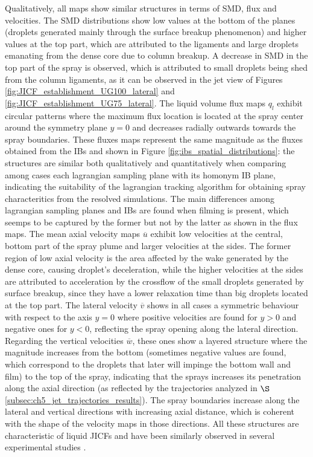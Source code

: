 Qualitatively, all maps show similar structures in terms of SMD, flux and velocities. The SMD distributions show low values at the bottom of the planes (droplets generated mainly through the surface breakup phenomenon) and higher values at the top part, which are attributed to the ligaments and large droplets emanating from the dense core due to column breakup. A decrease in SMD in the top part of the spray is observed, which is attributed to small droplets being shed from the column ligaments, as it can be observed in the jet view of Figures \ref{fig:JICF_establishment_UG100_lateral} and \ref{fig:JICF_establishment_UG75_lateral}. The liquid volume flux maps $q_l$ exhibit circular patterns where the maximum flux location is located at the spray center around the symmetry plane $y = 0$ and decreases radially outwards towards the spray boundaries. These fluxes maps represent the same magnitude as the fluxes obtained from the IBs and shown in Figure \ref{fig:ibs_spatial_distributions}: the structures are similar both qualitatively and quantitatively when comparing among cases each lagrangian sampling plane with its homonym IB plane, indicating the suitability of the lagrangian tracking algorithm for obtaining spray characteritics from the resolved simulations. The main differences among lagrangian sampling planes and IBs are found when filming is present, which seemps to be captured by the former but not by the latter as shown in the flux maps. The mean axial velocity maps $\overline{u}$ exhibit low velocities at the central, bottom part of the spray plume and larger velocities at the sides. The former region of low axial velocity is the area affected by the wake generated by the dense core, causing droplet's deceleration, while the higher velocities at the sides are attributed to acceleration by the crossflow of the small droplets generated  by surface breakup, since they have a lower relaxation time than big droplets located at the top part. The lateral velocity $\overline{v}$ shows in all cases a symmetric behaviour with respect to the axis $y = 0$ where positive velocities are found for $y > 0$ and negative ones for $y < 0$, reflecting the spray opening along the lateral direction. Regarding the vertical velocities $\overline{w}$, these ones show a layered structure where the magnitude increases from the bottom (sometimes negative values are found, which correspond to the droplets that later will impinge the bottom wall and film) to the top of the spray, indicating that the sprays increases its penetration along the axial direction (as reflected by the trajectories analyzed in $\S$\ref{subsec:ch5_jet_trajectories_results}). The spray boundaries increase along the lateral and vertical directions with increasing axial distance, which is coherent with the shape of the velocity maps in those directions. All these structures are characteristic of liquid JICFs and have been similarly observed in several experimental studies .

